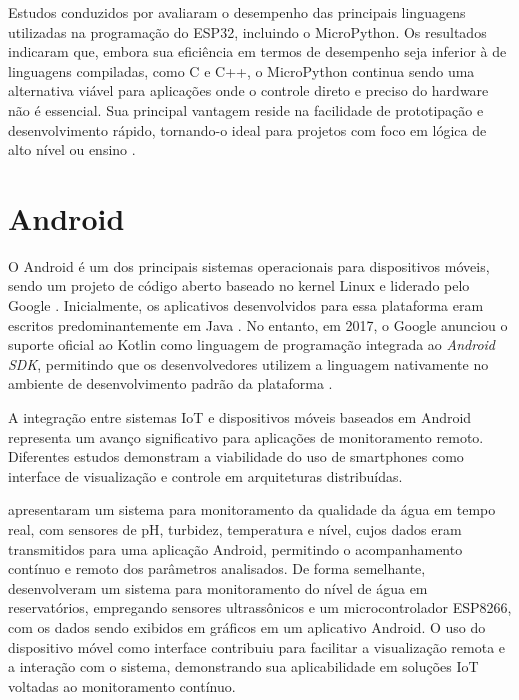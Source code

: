 Estudos conduzidos por  avaliaram o desempenho das principais linguagens utilizadas na programação do ESP32, incluindo o MicroPython. Os resultados indicaram que, embora sua eficiência em termos de desempenho seja inferior à de linguagens compiladas, como C e C++, o MicroPython continua sendo uma alternativa viável para aplicações onde o controle direto e preciso do hardware não é essencial. Sua principal vantagem reside na facilidade de prototipação e desenvolvimento rápido, tornando-o ideal para projetos com foco em lógica de alto nível ou ensino \cite{tanganelli2019rapid}.



\section{Android}

O Android é um dos principais sistemas operacionais para dispositivos móveis, sendo um projeto de código aberto baseado no kernel Linux e liderado pelo Google \cite{ABLESON2011}. Inicialmente, os aplicativos desenvolvidos para essa plataforma eram escritos predominantemente em Java \cite{ABLESON2011}. No entanto, em 2017, o Google anunciou o suporte oficial ao Kotlin como linguagem de programação integrada ao \textit{Android SDK}, permitindo que os desenvolvedores utilizem a linguagem nativamente no ambiente de desenvolvimento padrão da plataforma \cite{SILLS2023}.

A integração entre sistemas IoT e dispositivos móveis baseados em Android representa um avanço significativo para aplicações de monitoramento remoto. Diferentes estudos demonstram a viabilidade do uso de smartphones como interface de visualização e controle em arquiteturas distribuídas. 

 apresentaram um sistema para monitoramento da qualidade da água em tempo real, com sensores de pH, turbidez, temperatura e nível, cujos dados eram transmitidos para uma aplicação Android, permitindo o acompanhamento contínuo e remoto dos parâmetros analisados. De forma semelhante,  desenvolveram um sistema para monitoramento do nível de água em reservatórios, empregando sensores ultrassônicos e um microcontrolador ESP8266, com os dados sendo exibidos em gráficos em um aplicativo Android. O uso do dispositivo móvel como interface contribuiu para facilitar a visualização remota e a interação com o sistema, demonstrando sua aplicabilidade em soluções IoT voltadas ao monitoramento contínuo.


